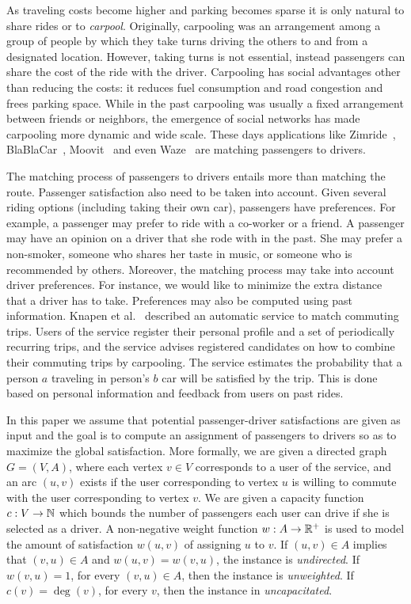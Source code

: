 
As traveling costs become higher and parking becomes sparse it is only
natural to share rides or to \emph{carpool}.  Originally, carpooling
was an arrangement among a group of people by which they take turns
driving the others to and from a designated location.  However, taking
turns is not essential, instead passengers can share the cost of the
ride with the driver.  Carpooling has social advantages other than
reducing the costs: it reduces fuel consumption and road congestion
and frees parking space.  
%
While in the past carpooling was usually a fixed arrangement between
friends or neighbors, the emergence of social networks has made
carpooling more dynamic and wide scale.  These days applications like
Zimride~\cite{zimride}, BlaBlaCar~\cite{blablacar},
Moovit~\cite{moovit} and even Waze~\cite{waze} are matching passengers
to drivers.

The matching process of passengers to drivers entails more than
matching the route.
%
Passenger satisfaction also need to be taken into account.  Given
several riding options (including taking their own car), passengers
have preferences.  For example, a passenger may prefer to ride with a
co-worker or a friend.  A passenger may have an opinion on a driver
that she rode with in the past.  She may prefer a non-smoker, someone
who shares her taste in music, or someone who is recommended by
others.
%
Moreover, the matching process may take into account driver
preferences.  For instance, we would like to minimize the extra
distance that a driver has to take.
%
Preferences may also be computed using past information.  Knapen et
al.~\cite{knapen2013estimating} described an automatic service to
match commuting trips.  Users of the service register their personal
profile and a set of periodically recurring trips, and the service
advises registered candidates on how to combine their commuting trips
by carpooling.  The service estimates the probability that a person
$a$ traveling in person's $b$ car will be satisfied by the trip.  This
is done based on personal information and feedback from users on past
rides.

In this paper we assume that potential passenger-driver satisfactions
are given as input and the goal is to compute an assignment of
passengers to drivers so as to maximize the global satisfaction.
%
More formally, we are given a directed graph $G = (V, A)$, where each
vertex $v \in V$ corresponds to a user of the service, and an arc $(u,
v)$ exists if the user corresponding to vertex $u$ is willing to
commute with the user corresponding to vertex $v$.  We are given a
capacity function $c: V \rightarrow \mathbb{N}$ which bounds the number of
passengers each user can drive if she is selected as a driver.  A
non-negative weight function $w : A \rightarrow \mathbb{R}^+$ is used to model
the amount of satisfaction $w(u,v)$ of assigning $u$ to $v$.
%
If $(u,v) \in A$ implies that $(v,u) \in A$ and $w(u,v) = w(v,u)$, the
instance is \emph{undirected}.  If $w(v,u) = 1$, for every $(v,u) \in
A$, then the instance is \emph{unweighted}.  If $c(v) = \deg(v)$, for
every $v$, then the instance in \emph{uncapacitated}.

